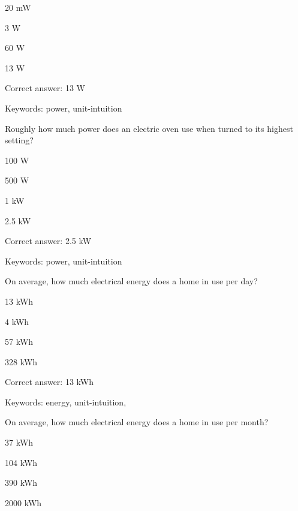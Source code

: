 \begin{answer}
	\item 20 mW
	\item 3 W
	\item 60 W
	\item 13 W
\end{answer}

Correct answer: 13 W

Keywords: power, unit-intuition

\begin{question}
	\item Roughly how much power does an electric oven use when turned to its highest setting?
\end{question}

\begin{answer}
	\item 100 W
	\item 500 W
	\item 1 kW
	\item 2.5 kW
\end{answer}

Correct answer: 2.5 kW

Keywords: power, unit-intuition

\begin{question}
	\item On average, how much electrical energy does a home in \Hawaii use per day?
\end{question}

\begin{answer}
	\item 13 kWh
	\item 4 kWh
	\item 57 kWh
	\item 328 kWh
\end{answer}

Correct answer: 13 kWh

Keywords: energy, unit-intuition, \Hawaii 

\begin{question}
	\item On average, how much electrical energy does a home in \Hawaii use per month?
\end{question}

\begin{answer}
	\item 37 kWh
	\item 104 kWh
	\item 390 kWh
	\item 2000 kWh
\end{answer}

